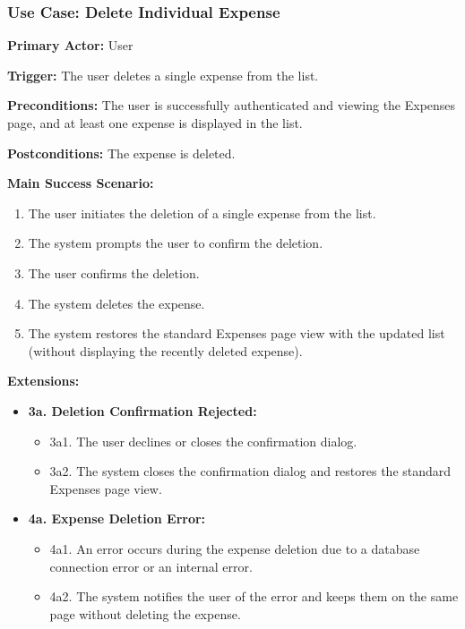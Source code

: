 \subsubsection{\textbf{Use Case: Delete Individual Expense}}

\textbf{Primary Actor:} User

\textbf{Trigger:} The user deletes a single expense from the list.

\textbf{Preconditions:} The user is successfully authenticated and viewing the Expenses page, and at least one expense is displayed in the list.

\textbf{Postconditions:} The expense is deleted.

\vspace{0.5cm}

\textbf{Main Success Scenario:}

\begin{enumerate} [leftmargin=0.75cm, noitemsep]
    \item The user initiates the deletion of a single expense from the list.
    \item The system prompts the user to confirm the deletion.
    \item The user confirms the deletion.
    \item The system deletes the expense.
    \item The system restores the standard Expenses page view with the updated list (without displaying the recently deleted expense).
\end{enumerate}

\vspace{0.3cm}

\textbf{Extensions:}

\begin{itemize} [label={}, leftmargin=0.75cm, noitemsep]
    \item \textbf{3a. Deletion Confirmation Rejected:}
    \begin{itemize} [label={}, leftmargin=0.75cm, noitemsep]
        \item 3a1. The user declines or closes the confirmation dialog.
        \item 3a2. The system closes the confirmation dialog and restores the standard Expenses page view.
    \end{itemize}

    \item \textbf{4a. Expense Deletion Error:}
    \begin{itemize} [label={}, leftmargin=0.75cm, noitemsep]
        \item 4a1. An error occurs during the expense deletion due to a database connection error or an internal error.
        \item 4a2. The system notifies the user of the error and keeps them on the same page without deleting the expense.
    \end{itemize}
\end{itemize}